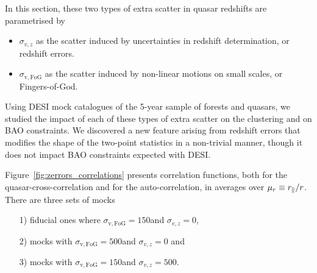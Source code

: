 In this section, these two types of extra scatter in quasar redshifts are parametrised by
\begin{itemize}
 \item $\sigma_{v, z}$ as the scatter induced by uncertainties in redshift determination, or redshift errors.
 \item $\sigma_\mathrm{v, FoG}$ as the scatter induced by non-linear motions on small scales, or Fingers-of-God.
\end{itemize}

Using DESI mock catalogues of the 5-year sample of \lya forests and quasars, 
we studied the impact of each of these types of extra scatter on the clustering and 
on BAO constraints. We discovered a new feature arising from redshift errors that 
modifies the shape of the two-point statistics in a non-trivial manner, 
though it does not impact BAO constraints expected with DESI. 




Figure~\ref{fig:zerrors_correlations} presents correlation functions, both 
for the quasar-\lya cross-correlation and for the \lya auto-correlation, 
in averages over $\mu_r \equiv {r_\parallel}/r$. There are three sets of mocks
\begin{itemize}
\item[1)] fiducial ones where $\sigma_\mathrm{v, FoG} = 150$\kms and $\sigma_{v, z} = 0$, 
\item[2)] mocks with $\sigma_\mathrm{v, FoG} = 500$\kms and $\sigma_{v, z} = 0$ and 
\item[3)] mocks with $\sigma_\mathrm{v, FoG} = 150$\kms and $\sigma_{v, z} = 500$\kms. 
\end{itemize}

